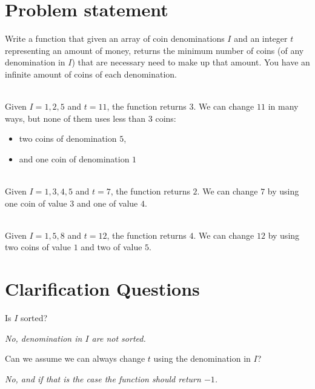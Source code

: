 \section{Problem statement}
\begin{exercise}
Write a function that given an array of coin denominations $I$ and an integer $t$ representing an amount of money, returns
the minimum number of coins (of any denomination in $I$) that are necessary need to make up that amount. 
You have an infinite amount of coins of each denomination. 
	\begin{example}
		\label{ex:coin_change:example1}
		\hfill \\
		Given $I={1,2,5}$ and $t=11$, the function returns $3$.
		We can change $11$ in many ways, but none of them uses less than $3$ coins:
		\begin{itemize}
			\item two coins of denomination $5$,
			\item and one coin of denomination $1$
		\end{itemize}
	\end{example}

	\begin{example}
		\hfill \\
		Given $I={1,3,4,5}$ and $t=7$, the function returns $2$.
		We can change $7$ by using one coin of value $3$ and one of value $4$.
	\end{example}

	\begin{example}
		\hfill \\
		Given $I={1,5,8}$ and $t=12$, the function returns $4$.
		We can change $12$ by using two coins of value $1$ and two of value $5$.
	\end{example}
\end{exercise}

\section{Clarification Questions}

\begin{QandA}
	\item Is $I$ sorted?
	\begin{answered}
		\textit{No, denomination in $I$ are not sorted.}
	\end{answered}

	\item Can we assume we can always change $t$ using the denomination in $I$?
	\begin{answered}
		\textit{No, and if that is the case the function should return $-1$.}
	\end{answered}
	
\end{QandA}

